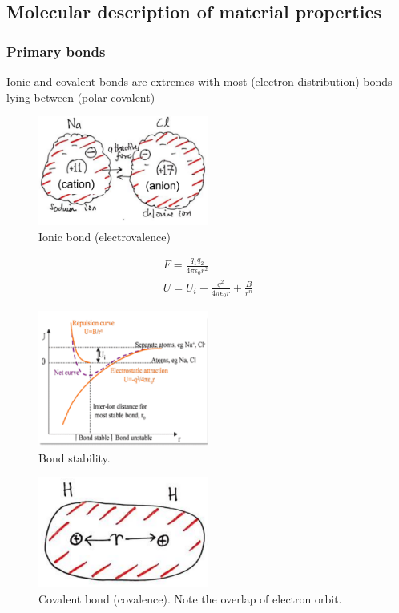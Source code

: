\subsection{Molecular description of material properties}
\subsubsection{Primary bonds}
Ionic and covalent bonds are extremes with most (electron distribution) bonds lying between (polar covalent)
\begin{figure}[H]
	\centering
	\includegraphics[width = 0.5\textwidth]{./img/figure7.png}
	\caption{Ionic bond (electrovalence)}
\end{figure}
\begin{gather}
	F = \frac{q_1 q_2}{4\pi \epsilon_0 r^2}\\
	U = U_i - \frac{q^2}{4\pi\epsilon_0 r} + \frac{B}{r^n}
\end{gather}
\begin{figure}[H]
	\centering
	\includegraphics[width = 0.5\textwidth]{./img/figure8.png}
	\caption{Bond stability.}
\end{figure}
\begin{figure}[H]
	\centering
	\includegraphics[width = 0.5\textwidth]{./img/figure9.png}
	\caption{Covalent bond (covalence). Note the overlap of electron orbit.}
\end{figure}
